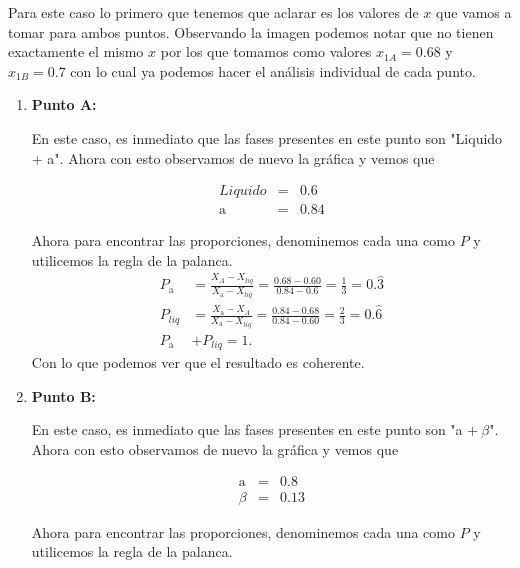 \documentclass{report}
\begin{document}
Para este caso lo primero que tenemos que aclarar es los valores de $x$ que vamos a tomar para ambos puntos. Observando la imagen podemos notar que no tienen exactamente el mismo $x$ por los que tomamos como valores $x_{1A}=0.68$ y $x_{1B}=0.7$ con lo cual ya podemos hacer el análisis individual de cada punto.

\begin{enumerate}
  \item \textbf{Punto A:}

    En este caso, es inmediato que las fases presentes en este punto son "Liquido $+$ a". Ahora con esto observamos de nuevo la gráfica y vemos que

    \begin{eqnarray*}
      Liquido & = & 0.6 \\
      \text{a} & = & 0.84
    \end{eqnarray*}

    Ahora para encontrar las proporciones, denominemos cada una como $P$ y utilicemos la regla de la palanca.
     \begin{align*}
P_{\text{a}} &= \frac{X_A - X_{liq}}{X_{\text{a}}-X_{liq}}=\frac{0.68 - 0.60}{0.84-0.6}=\frac{1}{3}=0.\hat{3}\\
P_{liq} &= \frac{X_{\text{a}} - X_{A}}{X_{\text{a}}-X_{liq}}=\frac{0.84-0.68}{0.84-0.60}=\frac{2}{3}=0.\hat{6}\\
       P_{\text{a}} &+ P_{liq} = 1
    .\end{align*}
    Con lo que podemos ver que el resultado es coherente.

  \item \textbf{Punto B:}

    En este caso, es inmediato que las fases presentes en este punto son "a $+\ \beta$". Ahora con esto observamos de nuevo la gráfica y vemos que 

    \begin{eqnarray*}
      \text{a} & = & 0.8 \\
      \beta & = & 0.13
    \end{eqnarray*}

    Ahora para encontrar las proporciones, denominemos cada una como $P$ y utilicemos la regla de la palanca.


\end{enumerate}
\end{document}
